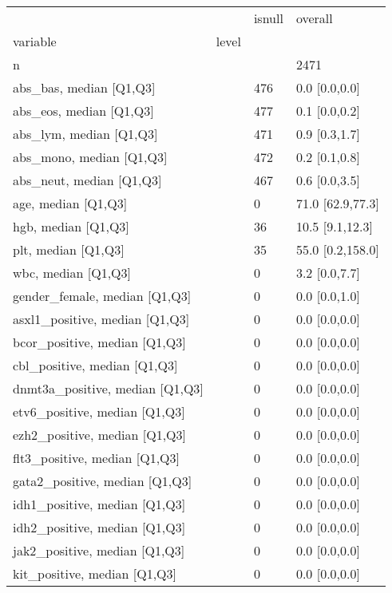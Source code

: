 \begin{tabular}{llll}
\toprule
                 &    & isnull &           overall \\
variable & level &        &                   \\
\midrule
n &    &        &              2471 \\
abs\_bas, median [Q1,Q3] &    &    476 &     0.0 [0.0,0.0] \\
abs\_eos, median [Q1,Q3] &    &    477 &     0.1 [0.0,0.2] \\
abs\_lym, median [Q1,Q3] &    &    471 &     0.9 [0.3,1.7] \\
abs\_mono, median [Q1,Q3] &    &    472 &     0.2 [0.1,0.8] \\
abs\_neut, median [Q1,Q3] &    &    467 &     0.6 [0.0,3.5] \\
age, median [Q1,Q3] &    &      0 &  71.0 [62.9,77.3] \\
hgb, median [Q1,Q3] &    &     36 &   10.5 [9.1,12.3] \\
plt, median [Q1,Q3] &    &     35 &  55.0 [0.2,158.0] \\
wbc, median [Q1,Q3] &    &      0 &     3.2 [0.0,7.7] \\
gender\_female, median [Q1,Q3] &    &      0 &     0.0 [0.0,1.0] \\
asxl1\_positive, median [Q1,Q3] &    &      0 &     0.0 [0.0,0.0] \\
bcor\_positive, median [Q1,Q3] &    &      0 &     0.0 [0.0,0.0] \\
cbl\_positive, median [Q1,Q3] &    &      0 &     0.0 [0.0,0.0] \\
dnmt3a\_positive, median [Q1,Q3] &    &      0 &     0.0 [0.0,0.0] \\
etv6\_positive, median [Q1,Q3] &    &      0 &     0.0 [0.0,0.0] \\
ezh2\_positive, median [Q1,Q3] &    &      0 &     0.0 [0.0,0.0] \\
flt3\_positive, median [Q1,Q3] &    &      0 &     0.0 [0.0,0.0] \\
gata2\_positive, median [Q1,Q3] &    &      0 &     0.0 [0.0,0.0] \\
idh1\_positive, median [Q1,Q3] &    &      0 &     0.0 [0.0,0.0] \\
idh2\_positive, median [Q1,Q3] &    &      0 &     0.0 [0.0,0.0] \\
jak2\_positive, median [Q1,Q3] &    &      0 &     0.0 [0.0,0.0] \\
kit\_positive, median [Q1,Q3] &    &      0 &     0.0 [0.0,0.0] \\

\end{tabular}
